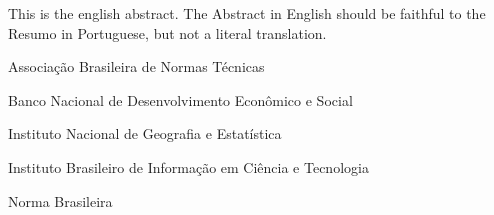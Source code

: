 \documentclass[
	12pt,				%
	openright,			%
	oneside,			%
	a4paper,			%
	tcc,			%
	]{ABNT-DC-UEL}
\begin{document}
\begin{Abstract}
 This is the english abstract. The Abstract in English should be faithful to the
 Resumo in Portuguese, but not a literal translation.
\end{Abstract}

\listoffigures*
\cleardoublepage

\listoftables*
\cleardoublepage

\begin{siglas}
  \item[ABNT] Associação Brasileira de Normas Técnicas
  \item[BNDES] Banco Nacional de Desenvolvimento Econômico e Social
  \item[IBGE] Instituto Nacional de Geografia e Estatística
  \item[IBICT] Instituto Brasileiro de Informação em Ciência e Tecnologia
  \item[NBR] Norma Brasileira
\end{siglas}


\tableofcontents*
\cleardoublepage



\textual
\pagestyle{dc-uel-header} %


\end{document}
